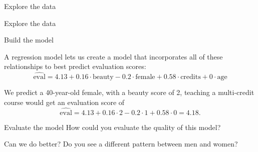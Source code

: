 \documentclass{beamer}\usepackage[]{graphicx}\usepackage[]{color}
\newenvironment{knitrout}{}{} %
\begin{document}
\begin{darkframes}
    \begin{frame}{Explore the data}
\begin{knitrout}


\end{knitrout}
    \end{frame}

    \begin{frame}{Explore the data}
\begin{knitrout}


\end{knitrout}
    \end{frame}

    \begin{frame}{Build the model}
      
      \begin{center}
        A regression model lets us create a model that incorporates all of these relationships to best predict evaluation scores:
        \[
          \widehat{\text{eval}} = 
            4.13 +
            0.16 \cdot \text{beauty} -
            0.2 \cdot \text{female} +
            0.58 \cdot \text{credits} +
            0 \cdot \text{age}
        \]
        
        \pause
          
        We predict a 40-year-old female, with a beauty score of 2, teaching a multi-credit course would get an evaluation score of 
        \[
          \widehat{\text{eval}} = 4.13 + 0.16 \cdot 2 - 0.2 \cdot 1 + 0.58 \cdot 0 = 4.18.
        \]
        
      \end{center}
    \end{frame}

    \begin{frame}{Evaluate the model}
      How could you evaluate the quality of this model?
    \end{frame}

    \begin{frame}{Can we do better?}
      Do you see a different pattern between men and women?


\end{frame}
\end{darkframes}
\end{document}
